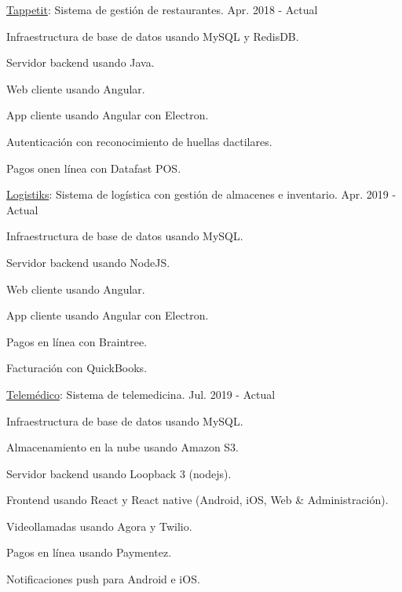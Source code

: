 \begin{cventries}
  \cventry
    {\href{https://tappetit.com}{Tappetit}: Sistema de gestión de restaurantes.} %
    {} %
    {} %
    {Apr. 2018 - Actual} %
    {
      \begin{cvitems} %
        \item {Infraestructura de base de datos usando MySQL y RedisDB.}
        \item {Servidor backend usando Java.}
        \item {Web cliente usando Angular.}
        \item {App cliente usando Angular con Electron.}
        \item {Autenticación con reconocimiento de huellas dactilares.}
        \item {Pagos onen línea con Datafast POS.}
      \end{cvitems}
    }

  \cventry
    {\href{https://logistiksusa.com/}{Logistiks}: Sistema de logística con gestión de almacenes e inventario.} %
    {} %
    {} %
    {Apr. 2019 - Actual} %
    {
      \begin{cvitems} %
        \item {Infraestructura de base de datos usando MySQL.}
        \item {Servidor backend usando NodeJS.}
        \item {Web cliente usando Angular.}
        \item {App cliente usando Angular con Electron.}
        \item {Pagos en línea con Braintree.}
        \item {Facturación con QuickBooks.}
      \end{cvitems}
    }

  \cventry
    {\href{https://telemedico.com.ec/}{Telemédico}: Sistema de telemedicina.} %
    {} %
    {} %
    {Jul. 2019 - Actual} %
    {
      \begin{cvitems} %
        \item {Infraestructura de base de datos usando MySQL.}
        \item {Almacenamiento en la nube usando Amazon S3.}
        \item {Servidor backend usando Loopback 3 (nodejs).}
        \item {Frontend usando React y React native (Android, iOS, Web \& Administración).}
        \item {Videollamadas usando Agora y Twilio.}
        \item {Pagos en línea usando Paymentez.}
        \item {Notificaciones push para Android e iOS.}
      \end{cvitems}
    }


\end{cventries}
